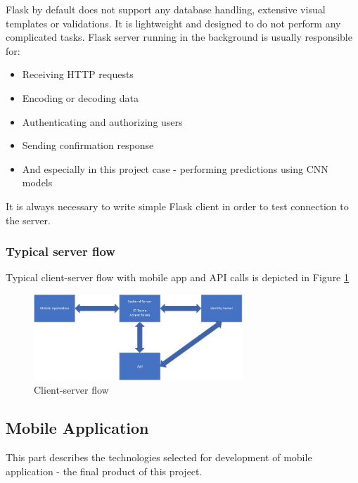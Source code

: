 \documentclass[../Main.tex]{subfiles}
\begin{document}
    Flask by default does not support any database handling, extensive visual templates or validations. It is lightweight and designed to do not perform any complicated tasks. Flask server running in the background is usually responsible for:
    \begin{itemize}
        \item Receiving HTTP requests
        \item Encoding or decoding data
        \item Authenticating and authorizing users
        \item Sending confirmation response
        \item And especially in this project case - performing predictions using CNN models
    \end{itemize}
    
    It is always necessary to write simple Flask client in order to test connection to the server.

    \subsubsection{Typical server flow}
    Typical client-server flow with mobile app and API calls is depicted in Figure \ref{fig:server-flow} \\
    
    \begin{figure}[ht]
        \centering
        \includegraphics[width=0.7\textwidth]{Images/03_todo.jpg}
        \caption{Client-server flow}
            \label{fig:server-flow}
    \end{figure}


\subsection{Mobile Application}
    This part describes the technologies selected for development of mobile application - the final product of this project.
    
\end{document}
